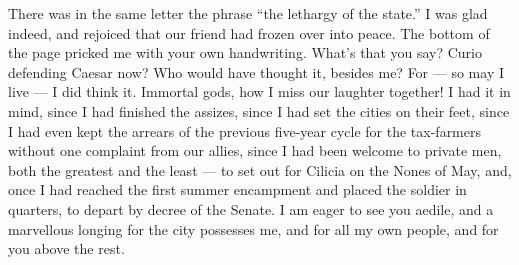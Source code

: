 There was in the same letter the phrase ``the lethargy of the state.'' I was glad indeed, and rejoiced that our friend had frozen over into peace. The bottom of the page pricked me with your own handwriting. What's that you say? Curio defending Caesar now? Who would have thought it, besides me? For --- so may I live --- I did think it. Immortal gods, how I miss our laughter together! I had it in mind, since I had finished the assizes, since I had set the cities on their feet, since I had even kept the arrears of the previous five-year cycle for the tax-farmers without one complaint from our allies, since I had been welcome to private men, both the greatest and the least --- to set out for Cilicia on the Nones of May, and, once I had reached the first summer encampment and placed the soldier in quarters, to depart by decree of the Senate. I am eager to see you aedile, and a marvellous longing for the city possesses me, and for all my own people, and for you above the rest.
